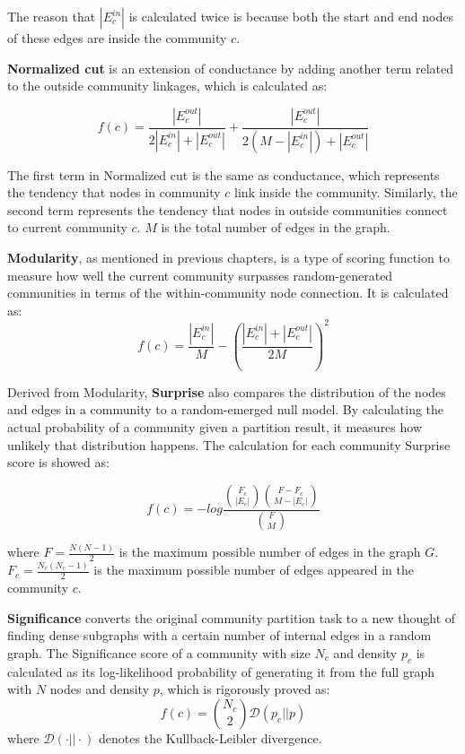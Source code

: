 The reason that $|E_{c}^{in}|$ is calculated twice is because both the start and end nodes of these edges are inside the community $c$. 

\textbf{Normalized cut} is an extension of conductance by adding another term related to the outside community linkages, which is calculated as:

\begin{equation}
f(c) = \frac{|E_{c}^{out}|}{2|E_{c}^{in}|+|E_{c}^{out}|} + \frac{|E_{c}^{out}|}{2(M-|E_{c}^{in}|)+|E_{c}^{out}|}
\end{equation}

The first term in Normalized cut is the same as conductance, which represents the tendency that nodes in community $c$ link inside the community. Similarly, the second term represents the tendency that nodes in outside communities connect to current community $c$. $M$ is the total number of edges in the graph.

\textbf{Modularity}, as mentioned in previous chapters, is a type of scoring function to measure how well the current community surpasses random-generated communities in terms of the within-community node connection. It is calculated as:
\begin{equation}
f(c) = \frac{|E_{c}^{in}|}{M}-\left(\frac{|E_{c}^{in}|+|E_{c}^{out}|}{2M}\right)^2
\end{equation}

Derived from Modularity, \textbf{Surprise} \cite{aldecoa2013surprise,aldecoa2011deciphering} also compares the distribution of the nodes and edges in
a community to a random-emerged null model. By calculating the actual probability of a community given a partition result, it measures how unlikely that distribution happens. The calculation for each community Surprise score is showed as:

\begin{equation}
f(c) = -log\frac{\binom{F_c}{|E_c|}\binom{F-F_c}{M-|E_c|}}{\binom{F}{M}}
\end{equation}

where $F= \frac{N(N-1)}{2}$ is the maximum possible number of edges in the graph $G$. $F_c= \frac{N_c(N_c-1)}{2}$ is the maximum possible number of edges appeared in the community $c$.

\textbf{Significance} \cite{traag2013significant} converts the original community partition task to a new thought of finding dense subgraphs with a certain number of internal edges in a random graph. The Significance score of a community with size $N_c$ and density $p_c$ is calculated as its log-likelihood probability of generating it from the full graph with $N$ nodes and density $p$, which is rigorously proved  as:
\begin{equation}
f(c) = \binom{N_c}{2}\mathcal{D}(p_c|| p)
\end{equation}
where $\mathcal{D}(\cdot|| \cdot)$ denotes the Kullback-Leibler divergence.

